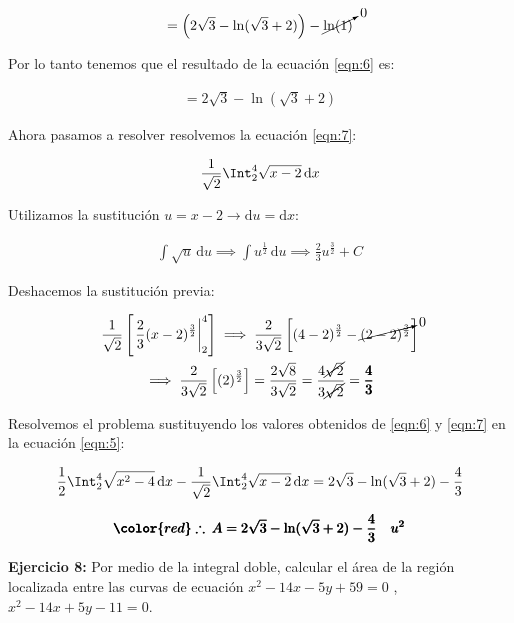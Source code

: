 \documentclass[12pt]{article}
\begin{document}
\begin{align*}
	=\left(2\sqrt{3} - \ln(\sqrt{3}+2)\right) - \cancelto{0}{\ln(1)}
\end{align*}

\noindent Por lo tanto tenemos que el resultado de la ecuación \eqref{eqn:6} es:

\begin{align*}
	=2\sqrt{3} - \ln(\sqrt{3}+2)
\end{align*}

\noindent Ahora pasamos a resolver resolvemos la ecuación \eqref{eqn:7}:

\begin{align*}
	\frac{1}{\sqrt{2}} \Int_2^4 \sqrt{x-2}\, \mathrm{d}x
\end{align*}

\noindent Utilizamos la sustitución $u=x-2 \to \mathrm{d}u = \mathrm{d}x$:

\begin{align*}
	\int \sqrt{u}\, \mathrm{d}u \implies \int u^{\frac{1}{2}}\, \mathrm{d}u \implies \frac{2}{3}u^{\frac{3}{2}} + C
\end{align*}

\noindent Deshacemos la sustitución previa:

\begin{multline*}
	\frac{1}{\sqrt{2}}\left[\left.\frac{2}{3}(x-2)^{\frac{3}{2}}\right|_2^4\right] \implies \frac{2}{3\sqrt{2}} \left[(4-2)^{\frac{3}{2}} - \cancelto{0}{(2-2)^{\frac{3}{2}}}\right]\\ \implies \frac{2}{3\sqrt{2}} \left[(2)^{\frac{3}{2}}\right] = \frac{2\sqrt{8}}{3\sqrt{2}} = \frac{4\cancel{\sqrt{2}}}{3\cancel{\sqrt{2}}} = \pmb{\frac{4}{3}}
\end{multline*}

\noindent Resolvemos el problema sustituyendo los valores obtenidos de \eqref{eqn:6} y \eqref{eqn:7} en la ecuación \eqref{eqn:5}:

\begin{align}
	\frac{1}{2} \Int_2^4 \sqrt{x^2-4}\, \mathrm{d}x - \frac{1}{\sqrt{2}} \Int_2^4 \sqrt{x-2}\, \mathrm{d}x = 2\sqrt{3} - \ln(\sqrt{3}+2) - \frac{4}{3}
\end{align}

\begin{align*}
	 \pmb{\color{red} \therefore\: A = 2\sqrt{3} - \ln(\sqrt{3}+2) - \frac{4}{3}\quad u^2}
\end{align*}

\noindent \textbf{Ejercicio 8:} Por medio de la integral doble, calcular el área
de la región localizada entre las curvas de ecuación $x^2 -14x -5y +59 = 0$ , 
$x^2-14x+5y-11=0$.
\end{document}
